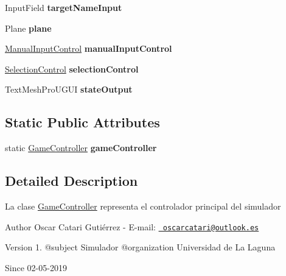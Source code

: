 \begin{DoxyCompactItemize}
\item 
\mbox{\label{class_game_controller_af7421b0db7e041d90138ce61a194b349}} 
Input\+Field {\bfseries target\+Name\+Input}
\item 
\mbox{\label{class_game_controller_a13254115c700f2a1c2d223844726d5d2}} 
Plane {\bfseries plane}
\item 
\mbox{\label{class_game_controller_a8440f525b85dcb4243c88bfedfdab79d}} 
\mbox{\hyperlink{class_manual_input_control}{Manual\+Input\+Control}} {\bfseries manual\+Input\+Control}
\item 
\mbox{\label{class_game_controller_a81276753525e476bace62b49ee3ce507}} 
\mbox{\hyperlink{class_selection_control}{Selection\+Control}} {\bfseries selection\+Control}
\item 
\mbox{\label{class_game_controller_a49eb3e3e0f37bf17509d245d70d53c92}} 
Text\+Mesh\+Pro\+U\+G\+UI {\bfseries state\+Output}
\end{DoxyCompactItemize}
\subsection*{Static Public Attributes}
\begin{DoxyCompactItemize}
\item 
\mbox{\label{class_game_controller_a46ccbbf4e13ee78f28da6b0ed2595cf3}} 
static \mbox{\hyperlink{class_game_controller}{Game\+Controller}} {\bfseries game\+Controller}
\end{DoxyCompactItemize}


\subsection{Detailed Description}
La clase \mbox{\hyperlink{class_game_controller}{Game\+Controller}} representa el controlador principal del simulador \begin{DoxyAuthor}{Author}
Oscar Catari Gutiérrez -\/ E-\/mail\+: \href{mailto:oscarcatari@outlook.es}{\texttt{ oscarcatari@outlook.\+es}} 
\end{DoxyAuthor}
\begin{DoxyVersion}{Version}
1. @subject Simulador @organization Universidad de La Laguna 
\end{DoxyVersion}
\begin{DoxySince}{Since}
02-\/05-\/2019 
\end{DoxySince}


